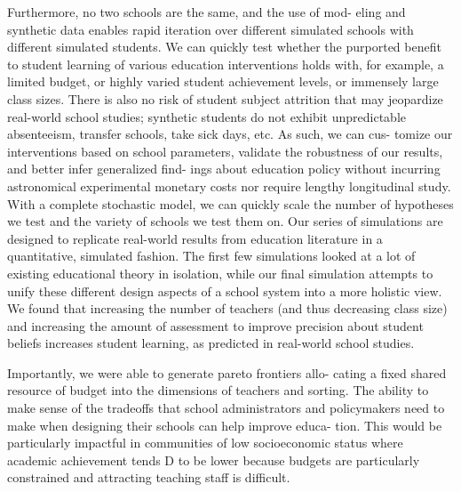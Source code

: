 \documentclass[10pt, letterpaper]{article}
\begin{document}
Furthermore, no two schools are the same, and the use of mod- eling and
synthetic data enables rapid iteration over different simulated schools
with different simulated students. We can quickly test whether the
purported benefit to student learning of various education interventions
holds with, for example, a limited budget, or highly varied student
achievement levels, or immensely large class sizes. There is also no
risk of student subject attrition that may jeopardize real-world school
studies; synthetic students do not exhibit unpredictable absenteeism,
transfer schools, take sick days, etc. As such, we can cus- tomize our
interventions based on school parameters, validate the robustness of our
results, and better infer generalized find- ings about education policy
without incurring astronomical experimental monetary costs nor require
lengthy longitudinal study. With a complete stochastic model, we can
quickly scale the number of hypotheses we test and the variety of
schools we test them on. Our series of simulations are designed to
replicate real-world results from education literature in a
quantitative, simulated fashion. The first few simulations looked at a
lot of existing educational theory in isolation, while our final
simulation attempts to unify these different design aspects of a school
system into a more holistic view. We found that increasing the number of
teachers (and thus decreasing class size) and increasing the amount of
assessment to improve precision about student beliefs increases student
learning, as predicted in real-world school studies.

Importantly, we were able to generate pareto frontiers allo- cating a
fixed shared resource of budget into the dimensions of teachers and
sorting. The ability to make sense of the tradeoffs that school
administrators and policymakers need to make when designing their
schools can help improve educa- tion. This would be particularly
impactful in communities of low socioeconomic status where academic
achievement tends D to be lower because budgets are particularly
constrained and attracting teaching staff is difficult.
\end{document}
